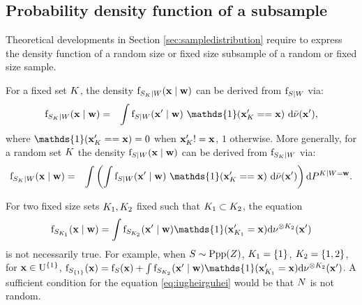 \subsection{Probability density function of a subsample}

Theoretical developments in Section \ref{sec:sampledistribution} require to express the density function of a random size or fixed size subsample of a random or fixed size sample.

For a fixed set $K$, the density 
$\mathrm{f}_{S_K\mid W}(\mathbf{x}\mid\mathbf{w})$
can be derived from $\mathrm{f}_{S\mid W}$ via:
\begin{eqnarray}
\density_{\Sample_\Sampleindex\mid W}(\position\mid\mathbf{w})&=&
\int \density_{\Sample\mid W}(\position'\mid \mathbf{w})~\mathds{1}(\position'_\Sampleindex==\position)~\derive\dominantUbar(\position'),
\end{eqnarray}
where $\mathds{1}(\position'_\Sampleindex==\position)=0$ when $\mathbf{x}'_K!=\mathbf{x}$, $1$ otherwise.  
More generally, for a random set $K$ the density 
$\mathrm{f}_{S\mid W}(\mathbf{x}\mid\mathbf{w})$
can be derived from $\mathrm{f}_{S_K\mid W}$ via:
\begin{eqnarray}
\density_{\Sample_\Sampleindex\mid W}(\position\mid\mathbf{w})&=&
\int\left(\int \density_{\Sample\mid W}(\position'\mid \mathbf{w})~\mathds{1}(\position'_\Sampleindex==\position)~\derive\dominantUbar(\position')\right)\derive P^{K\mid W=\mathbf{w}}.
\end{eqnarray}

\begin{remark}\label{remark:K1subsetK2}
For  two fixed size sets  $K_1, K_2$ fixed such that 
$K_1\subset K_2$, the equation 
\begin{equation}\label{eq:iugheirguhei}\density_{\Sample_{\Sampleindex_1}}(\position\mid \mathbf{w})=\int \density_{\Sample_{\Sampleindex_2}}(\position'\mid \mathbf{w})\mathds{1}(\position'_{\Sampleindex_1}=\position)\derive \dominantU^{\otimes K_2}(\position')
\end{equation}
is not necessarily true. 
For example, when $S\sim \mathrm{Ppp}(Z)$, 
$K_1=\{1\}$, $K_2=\{1,2\}$,
for $\mathbf{x} \in \mathrm{U}^{\{1\}}$, 
$\density_{\Sample_{\{1\}}}(\position)=\density_{\Sample}(\position)+\int \density_{\Sample_{\Sampleindex_2}}(\position'\mid \mathbf{w})\mathds{1}(\position'_{\Sampleindex_1}=\position)\derive \dominantU^{\otimes K_2}(\position')$.
A sufficient condition for the equation \eqref{eq:iugheirguhei} would be that $N$ is not random.
\end{remark}

